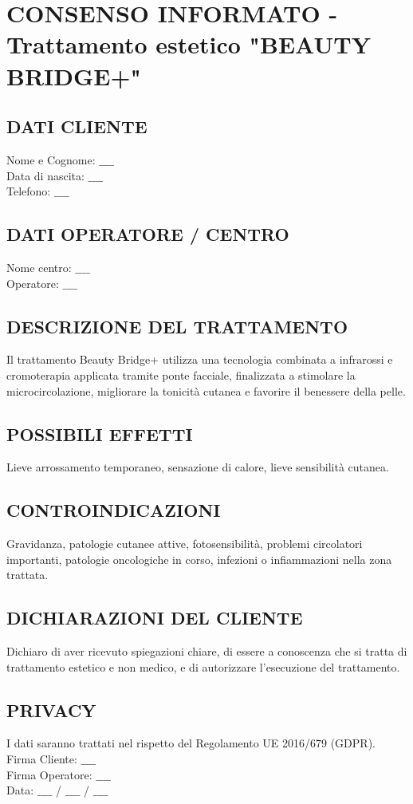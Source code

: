 
\newpage

\section{CONSENSO INFORMATO - Trattamento estetico "BEAUTY BRIDGE+"}
\subsection{DATI CLIENTE}
Nome e Cognome: $\_\_\_\_$\\
Data di nascita: $\_\_\_\_$\\
Telefono: $\_\_\_\_$

\subsection{DATI OPERATORE / CENTRO}
Nome centro: $\_\_\_\_$\\
Operatore: $\_\_\_\_$

\subsection{DESCRIZIONE DEL TRATTAMENTO}
Il trattamento Beauty Bridge+ utilizza una tecnologia combinata a infrarossi e cromoterapia applicata tramite ponte facciale, finalizzata a stimolare la microcircolazione, migliorare la tonicità cutanea e favorire il benessere della pelle.

\subsection{POSSIBILI EFFETTI}
Lieve arrossamento temporaneo, sensazione di calore, lieve sensibilità cutanea.

\subsection{CONTROINDICAZIONI}
Gravidanza, patologie cutanee attive, fotosensibilità, problemi circolatori importanti, patologie oncologiche in corso, infezioni o infiammazioni nella zona trattata.

\subsection{DICHIARAZIONI DEL CLIENTE}
Dichiaro di aver ricevuto spiegazioni chiare, di essere a conoscenza che si tratta di trattamento estetico e non medico, e di autorizzare l'esecuzione del trattamento.

\subsection{PRIVACY}
I dati saranno trattati nel rispetto del Regolamento UE 2016/679 (GDPR).\\
Firma Cliente: $\_\_\_\_$\\
Firma Operatore: $\_\_\_\_$\\
Data: $\_\_\_\_$ / $\_\_\_\_$ / $\_\_\_\_$
